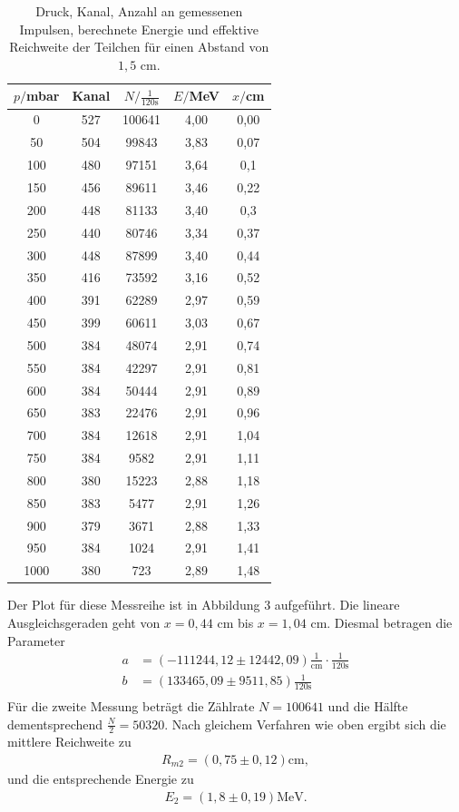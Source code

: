 \begin{table}[H]
  \centering
  \caption{Druck, Kanal, Anzahl an gemessenen Impulsen, berechnete Energie und effektive Reichweite der Teilchen für einen Abstand von $1,5$ $\si{\cm}$.}
  \label{tab:Parameter}
  \begin{tabular}{c c c c c}
    \toprule
    $p/$mbar& Kanal & $N/\frac{1}{120\si{\second}}$ & $E/$MeV & $x/$cm \\
    \bottomrule
    0 & 527 & 100641 & 4,00 & 0,00 \\
    50 & 504 & 99843 & 3,83 & 0,07 \\
    100 & 480 & 97151 & 3,64 & 0,1 \\
    150 & 456 & 89611 & 3,46 & 0,22 \\
    200 & 448 & 81133 & 3,40 & 0,3 \\
    250 & 440 & 80746 & 3,34 & 0,37 \\
    300 & 448 &87899 & 3,40 & 0,44 \\
    350 & 416 & 73592 & 3,16 & 0,52 \\
    400 & 391 & 62289 & 2,97 & 0,59 \\
    450 & 399 & 60611 & 3,03 & 0,67 \\
    500 & 384 & 48074 & 2,91 & 0,74 \\
    550 & 384 & 42297 & 2,91 & 0,81 \\
    600 & 384 & 50444 & 2,91 & 0,89 \\
    650 & 383 & 22476 & 2,91 & 0,96 \\
    700 & 384 & 12618 & 2,91 & 1,04 \\
    750 & 384 & 9582 & 2,91 & 1,11 \\
    800 & 380 & 15223 & 2,88 & 1,18 \\
    850 & 383 & 5477 & 2,91 & 1,26 \\
    900 & 379 & 3671 & 2,88 & 1,33 \\
    950 & 384 & 1024 & 2,91 & 1,41 \\
    1000 & 380 & 723 & 2,89 & 1,48 \\

     \bottomrule
  \end{tabular}
\end{table}
\noindent Der Plot für diese Messreihe ist in Abbildung 3 aufgeführt. Die lineare Ausgleichsgeraden geht von $x=0,44$ $\si{\cm}$ bis $x=1,04$ $\si{\cm}$. Diesmal betragen die Parameter
\begin{align*}
a &=  (-111244,12 \pm 12442,09) \frac{1}{\si{\centi\meter}}\cdot \frac{1}{120\si{\second}}\\
b &= (133465,09 \pm 9511,85)\frac{1}{120\si{\second}}\\
\end{align*}
Für die zweite Messung beträgt die Zählrate $N=100641$ und die Hälfte dementsprechend $\frac{N}{2}=50320$. 
Nach gleichem Verfahren wie oben ergibt sich die mittlere Reichweite zu
\begin{align*}
R_{m2} = (0,75 \pm 0,12) \si{\centi\meter},
\end{align*}
und die entsprechende Energie zu
\begin{align*}
E_{2} = (1,8 \pm 0,19) \si{\MeV}.
\end{align*}

